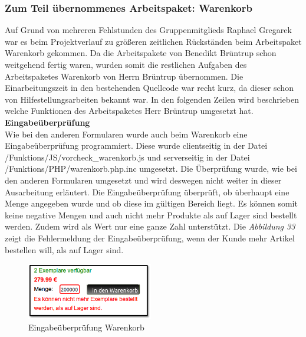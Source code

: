 \subsubsection{Zum Teil übernommenes Arbeitspaket: Warenkorb}
Auf Grund von mehreren Fehlstunden des Gruppenmitglieds Raphael Gregarek war es beim Projektverlauf zu größeren zeitlichen Rückständen beim Arbeitspaket \glqq Warenkorb\grqq{} gekommen. Da die Arbeitspakete von Benedikt Brüntrup schon weitgehend fertig waren, wurden somit die restlichen Aufgaben des Arbeitspaketes \glqq Warenkorb\grqq{} von Herrn Brüntrup übernommen. Die Einarbeitungszeit in den bestehenden Quellcode war recht kurz, da dieser schon von Hilfestellungsarbeiten bekannt war. In den folgenden Zeilen wird beschrieben welche Funktionen des Arbeitspaketes Herr Brüntrup umgesetzt hat.\\

\newpage
\textbf{Eingabeüberprüfung}\\
Wie bei den anderen Formularen wurde auch beim Warenkorb eine Eingabeüberprüfung programmiert. Diese wurde clientseitig in der Datei \glqq /Funktions/JS/vorcheck\_warenkorb.js\grqq{} und serverseitig in der Datei \glqq /Funktions/PHP/warenkorb.php.inc\grqq{} umgesetzt. Die Überprüfung wurde, wie bei den anderen Formularen umgesetzt und wird deswegen nicht weiter in dieser Ausarbeitung erläutert. Die Eingabeüberprüfung überprüft, ob überhaupt eine Menge angegeben wurde und ob diese im gültigen Bereich liegt. Es können somit keine negative Mengen und auch nicht mehr Produkte als auf Lager sind bestellt werden. Zudem wird als Wert nur eine ganze Zahl unterstützt. Die \textit{Abbildung 33} zeigt die Fehlermeldung der Eingabeüberprüfung, wenn der Kunde mehr Artikel bestellen will, als auf Lager sind.\\

\begin{figure}[H]
	\begin{center}
			\includegraphics[width=55mm]{Bilder/warenkorb_eingabepruefung.png}
	\end{center}
	\caption{Eingabeüberprüfung Warenkorb}
\end{figure}

